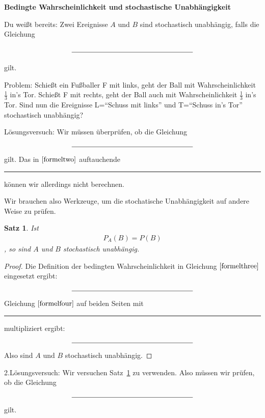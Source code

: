 \documentclass{article}
\newtheorem{theorem}{Satz}
\begin{document}
\setcounter{section}{1}\setcounter{subsection}{0}

\textbf{Bedingte Wahrscheinlichkeit und stochastische Unabh\"angigkeit}

Du weißt bereits: Zwei Ereignisse $A$ und $B$ sind stochastisch unabh\"angig, falls die Gleichung

\begin{align}
\rule{6cm}{.4pt}\label{formelone}
\end{align}

gilt.

Problem: Schießt ein Fußballer F mit links, geht der Ball mit Wahrscheinlichkeit $\frac{1}{3}$ in's Tor. Schießt F mit rechts, geht der Ball auch mit Wahrscheinlichkeit $\frac{1}{3}$ in's Tor.
Sind nun die Ereignisse L=``Schuss mit links'' und T=``Schuss in's Tor'' stochastisch unabh\"angig?

L\"osungsversuch: Wir m\"ussen \"uberpr\"ufen, ob die Gleichung 
\begin{align}
\rule{6cm}{.4pt} \label{formeltwo}
\end{align}
gilt.
Das in $\eqref{formeltwo}$ auftauchende \rule{1cm}{.4pt} k\"onnen wir allerdings nicht berechnen. 

Wir brauchen also Werkzeuge, um die stochatische Unabh\"angigkeit auf andere Weise zu pr\"ufen.

\begin{theorem}
  Ist 
  \begin{align}
  P_A\left(B\right) = P\left(B\right) \label{formelthree}
  \end{align}, so sind $A$ und $B$ stochastisch unabh\"angig.
  \label{thm:foo}
\end{theorem}
\begin{proof}
Die Definition der bedingten Wahrscheinlichkeit in Gleichung $\eqref{formelthree}$ eingesetzt ergibt:
\vspace{0,5cm}
\begin{align}
\rule{6cm}{.4pt} \label{formelfour}
\end{align}
Gleichung $\eqref{formelfour}$ auf beiden Seiten mit \rule{1cm}{.4pt} multipliziert ergibt:
\begin{align}
\rule{6cm}{.4pt} \notag
\end{align}
Also sind $A$ und $B$ stochastisch unabh\"angig.
\end{proof}

2.L\"osungsversuch: Wir versuchen Satz~\ref{thm:foo} zu verwenden. Also m\"ussen wir pr\"ufen, ob die Gleichung 
\begin{align}
\rule{6cm}{.4pt} \notag
\end{align}
gilt.
\end{document}
